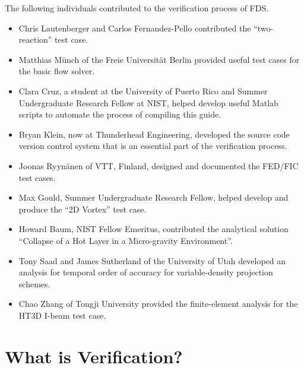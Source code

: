 \documentclass[11pt]{book}
\begin{document}
\label{acksection}

The following individuals contributed to the verification process of FDS.
\begin{itemize}
\item Chris Lautenberger and Carlos Fernandez-Pello contributed the ``two-reaction'' test case.
\item Matthias M\"{u}nch of the Freie Universit\"{a}t Berlin provided useful test cases for the basic flow solver.
\item Clara Cruz, a student at the University of Puerto Rico and Summer Undergraduate Research Fellow at NIST, helped develop useful Matlab scripts to automate the process of compiling this guide.
\item Bryan Klein, now at Thunderhead Engineering, developed the source code version control system that is an essential part of the verification process.
\item Joonas Ryyn\"{a}nen of VTT, Finland, designed and documented the FED/FIC test cases.
\item Max Gould, Summer Undergraduate Research Fellow, helped develop and produce the ``2D Vortex'' test case.
\item Howard Baum, NIST Fellow Emeritus, contributed the analytical solution ``Collapse of a Hot Layer in a Micro-gravity Environment''.
\item Tony Saad and James Sutherland of the University of Utah developed an analysis for temporal order of accuracy for variable-density projection schemes.
\item Chao Zhang of Tongji University provided the finite-element analysis for the HT3D I-beam test case.
\end{itemize}


\cleardoublepage
{}
{}
\tableofcontents

\cleardoublepage
{}
{}
\listoffigures

\cleardoublepage
{}
{}
\listoftables

\mainmatter


\chapter{What is Verification?}
\end{document}
